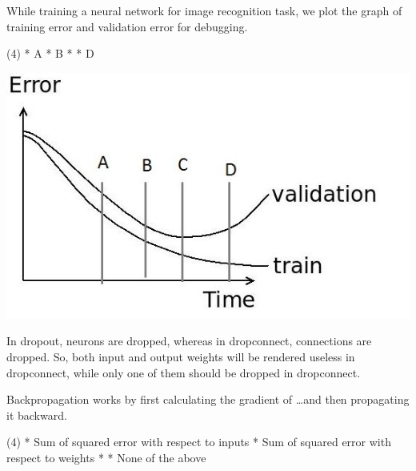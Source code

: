 \documentclass[10pt]{extarticle}
\begin{document}
\begin{exercise}
    \begin{minipage}[t]{.6\textwidth}
        While training a neural network for image recognition task, we plot the graph of training error and validation error for debugging.    
        \begin{choice} (4)
            * A
            * B
            *
            * D
        \end{choice}
    \end{minipage}
    \begin{minipage}[t]{.3\textwidth}
        \vspace*{0pt}
        \includegraphics{DL4}    
    \end{minipage}
\end{exercise}
\begin{solution}
    In dropout, neurons are dropped, whereas in dropconnect, connections are dropped. So, both input and output weights will be rendered useless in dropconnect, while only one of them should be dropped in dropconnect.
\end{solution}

\begin{exercise}
    Backpropagation works by first calculating the gradient of \dots and then propagating it backward.
    \begin{choice} (4)
        * Sum of squared error with respect to inputs
        * Sum of squared error with respect to weights
        *
        * None of the above
    \end{choice}
\end{exercise}
\begin{solution}
\end{solution}
\end{document}
